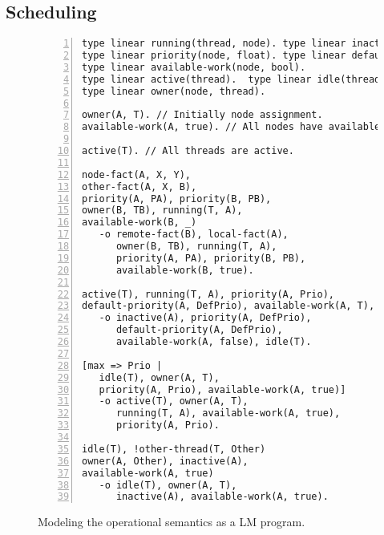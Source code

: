 \subsection{Scheduling}

\begin{figure}[h!]
\begin{Verbatim}[numbers=left,fontsize=\codesize,commandchars=*\#\&]
type linear running(thread, node). type linear inactive(node).
type linear priority(node, float). type linear default-priority(node, float).
type linear available-work(node, bool).
type linear active(thread).  type linear idle(thread).
type linear owner(node, thread).

owner(A, T). // Initially node assignment.
available-work(A, true). // All nodes have available work.

active(T). // All threads are active.

node-fact(A, X, Y),
other-fact(A, X, B),
priority(A, PA), priority(B, PB),
owner(B, TB), running(T, A),
available-work(B, _)
   -o remote-fact(B), local-fact(A),
      owner(B, TB), running(T, A),
      priority(A, PA), priority(B, PB),
      available-work(B, true).

active(T), running(T, A), priority(A, Prio),
default-priority(A, DefPrio), available-work(A, T),
   -o inactive(A), priority(A, DefPrio),
      default-priority(A, DefPrio),
      available-work(A, false), idle(T).

[max => Prio |
   idle(T), owner(A, T),
   priority(A, Prio), available-work(A, true)]
   -o active(T), owner(A, T),
      running(T, A), available-work(A, true),
      priority(A, Prio).

idle(T), !other-thread(T, Other)
owner(A, Other), inactive(A),
available-work(A, true)
   -o idle(T), owner(A, T),
      inactive(A), available-work(A, true).
\end{Verbatim}
\caption{Modeling the operational semantics as a LM program.}
\label{code:threads:modeling}
\end{figure}

